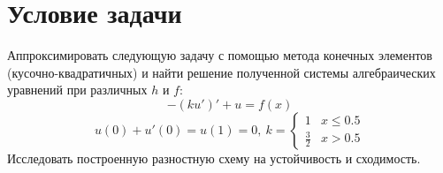 \documentclass[12pt, a4paper]{article}
\begin{document}
	
	
	\section{Условие задачи}
	\vspace{0.5cm}
	Аппроксимировать следующую задачу с помощью метода конечных элементов
	(кусочно-квадратичных) и найти решение полученной системы алгебраических 
	уравнений при различных $h$ и $f$:\\
	$$
		-(ku')' + u = f(x)
	$$
	$$
	u(0) + u'(0) = u(1) = 0,\ 
	k = \begin{cases}
			1 & x \leq 0.5\\
			\frac{3}{2} & x > 0.5
		\end{cases}
	$$
	Исследовать построенную разностную схему на устойчивость и сходимость.
	\vspace{0.5cm}
	
\end{document}
